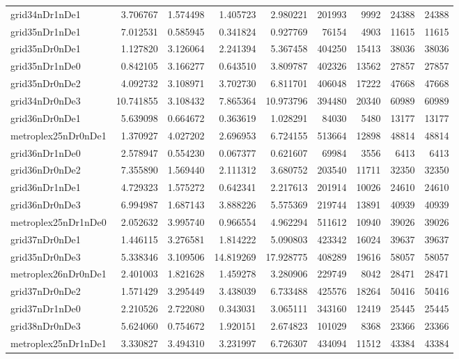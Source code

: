 \documentclass[../../../thesis.tex]{subfiles}
\begin{document}
\begin{longtable}{|l|r|r|r|r|r|r|r|r|}
grid34nDr1nDe1 & 3.706767 & 1.574498 & 1.405723 & 2.980221 & 201993 & 9992 & 24388 & 24388 \\
grid35nDr1nDe1 & 7.012531 & 0.585945 & 0.341824 & 0.927769 & 76154 & 4903 & 11615 & 11615 \\
grid35nDr0nDe1 & 1.127820 & 3.126064 & 2.241394 & 5.367458 & 404250 & 15413 & 38036 & 38036 \\
grid35nDr1nDe0 & 0.842105 & 3.166277 & 0.643510 & 3.809787 & 402326 & 13562 & 27857 & 27857 \\
grid35nDr0nDe2 & 4.092732 & 3.108971 & 3.702730 & 6.811701 & 406048 & 17222 & 47668 & 47668 \\
grid34nDr0nDe3 & 10.741855 & 3.108432 & 7.865364 & 10.973796 & 394480 & 20340 & 60989 & 60989 \\
grid36nDr0nDe1 & 5.639098 & 0.664672 & 0.363619 & 1.028291 & 84030 & 5480 & 13177 & 13177 \\
metroplex25nDr0nDe1 & 1.370927 & 4.027202 & 2.696953 & 6.724155 & 513664 & 12898 & 48814 & 48814 \\
grid36nDr1nDe0 & 2.578947 & 0.554230 & 0.067377 & 0.621607 & 69984 & 3556 & 6413 & 6413 \\
grid36nDr0nDe2 & 7.355890 & 1.569440 & 2.111312 & 3.680752 & 203540 & 11711 & 32350 & 32350 \\
grid36nDr1nDe1 & 4.729323 & 1.575272 & 0.642341 & 2.217613 & 201914 & 10026 & 24610 & 24610 \\
grid36nDr0nDe3 & 6.994987 & 1.687143 & 3.888226 & 5.575369 & 219744 & 13891 & 40939 & 40939 \\
metroplex25nDr1nDe0 & 2.052632 & 3.995740 & 0.966554 & 4.962294 & 511612 & 10940 & 39026 & 39026 \\
grid37nDr0nDe1 & 1.446115 & 3.276581 & 1.814222 & 5.090803 & 423342 & 16024 & 39637 & 39637 \\
grid35nDr0nDe3 & 5.338346 & 3.109506 & 14.819269 & 17.928775 & 408289 & 19616 & 58057 & 58057 \\
metroplex26nDr0nDe1 & 2.401003 & 1.821628 & 1.459278 & 3.280906 & 229749 & 8042 & 28471 & 28471 \\
grid37nDr0nDe2 & 1.571429 & 3.295449 & 3.438039 & 6.733488 & 425576 & 18264 & 50416 & 50416 \\
grid37nDr1nDe0 & 2.210526 & 2.722080 & 0.343031 & 3.065111 & 343160 & 12419 & 25445 & 25445 \\
grid38nDr0nDe3 & 5.624060 & 0.754672 & 1.920151 & 2.674823 & 101029 & 8368 & 23366 & 23366 \\
metroplex25nDr1nDe1 & 3.330827 & 3.494310 & 3.231997 & 6.726307 & 434094 & 11512 & 43384 & 43384 \\

\end{longtable}
\end{document}
